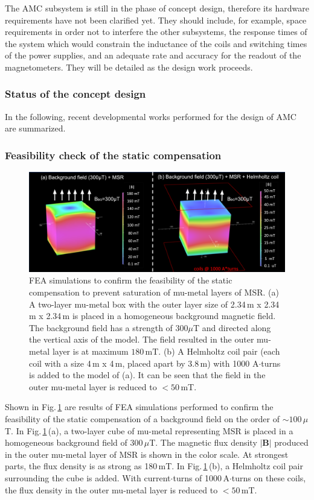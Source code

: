 The AMC subsystem is still in the phase of concept design, therefore its hardware requirements have not been clarified yet. 
They should include, for example, space requirements in order not to interfere the other subsystems, the response times of the system which would constrain the inductance of the coils and switching times of the power supplies, and an adequate rate and accuracy for the readout of the magnetometers. They will be detailed as the design work proceeds. 


\subsubsection{Status of the concept design}
In the following, recent developmental works performed for the design of AMC are summarized. 

\subsubsection*{Feasibility check of the static compensation}
\begin{figure}[htb]
    \centering
    \includegraphics[width=\textwidth]{graphics/AMC/feasibility.png}
    \caption{FEA simulations to confirm the feasibility of the static compensation to prevent saturation of mu-metal layers of MSR. (a) A two-layer mu-metal box with the outer layer size of 2.34\,m x 2.34\,m x 2.34\,m is placed in a homogeneous background magnetic field. The background field has a strength of  $300 \mu$T and directed along the vertical axis of the model. The field resulted in the outer mu-metal layer is at maximum $180\,$mT. (b) A Helmholtz coil pair (each coil with a size 4\,m x 4\,m, placed apart by 3.8\,m) with 1000 A$\cdot$turns is added to the model of (a). It can be seen that the field in the outer mu-metal layer is reduced to $<50\,$mT.    }
    \label{fig:amc_feasibility}
\end{figure}
Shown in Fig.\,\ref{fig:amc_feasibility} are results of FEA simulations performed to confirm the feasibility of the static compensation of a background field on the order of $\sim 100\,\mu$T. In Fig.\,\ref{fig:amc_feasibility}\,(a), a two-layer cube  of mu-metal representing MSR is placed in a homogeneous background field of $300\,\mu$T. The magnetic flux density $|\mathbf{B}|$ produced in the outer mu-metal layer of MSR is shown in the color scale. At strongest parts, the flux density is as strong as 180\,mT. In Fig.\,\ref{fig:amc_feasibility}\,(b), a Helmholtz coil pair surrounding the cube is added. With current$\cdot$turns of 1000\,A$\cdot$turns on these coils, the flux density in the outer mu-metal layer is reduced to $<50$\,mT.

